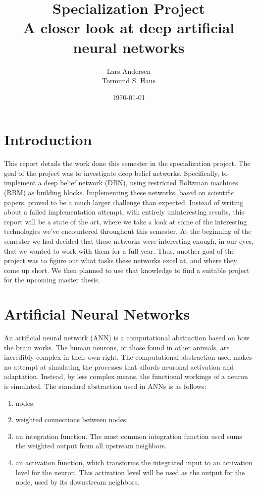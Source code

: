 \documentclass[11pt]{article}
\title{Specialization Project \\ A closer look at deep artificial neural networks}
\author{Lars Andersen \\
Tormund S. Haus}
\date{\today}
\begin{document}
\maketitle
\newpage
\tableofcontents

\clearpage
\section{Introduction}

This report details the work done this semester in the specialization project.  The goal of the project was to investigate deep belief networks. Specifically, to implement a deep belief network (DBN), using restricted Boltzman machines (RBM) as building blocks.  Implementing these networks, based on scientific papers, proved to be a much larger challenge than expected.  Instead of writing about a failed implementation attempt, with entirely uninteresting results, this report will be a state of the art, where we take a look at some of the interesting technologies we've encountered throughout this semester.  At the beginning of the semester we had decided that these networks were interesting enough, in our eyes, that we wanted to work with them for a full year.  Thus, another goal of the project was to figure out what tasks these networks excel at, and where they come up short.  We then planned to use that knowledge to find a suitable project for the upcoming master thesis.

\section{Artificial Neural Networks}

An artificial neural network (ANN) is a computational abstraction based on how the brain works.  The human neurons, or those found in other animals, are incredibly complex in their own right.  The computational abstraction used makes no attempt at simulating the processes that affords neuronal activation and adaptation.  Instead, by less complex means, the functional workings of a neuron is simulated.  The standard abstraction used in ANNs is as follows:

\begin{enumerate}
 \item nodes.
 \item weighted connections between nodes.
 \item an integration function.  The most common integration function used sums the weighted output from all upstream neighbors.
 \item an activation function, which transforms the integrated input to an activation level for the neuron.  This activation level will be used as the output for the node, used by its downstream neighbors.
\end{enumerate}
\end{document}
